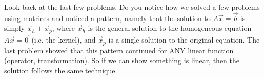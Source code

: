 Look back at the last few problems. Do you notice how we solved a few problems using matrices and noticed a pattern, namely that the solution to $A\vec x=\vec b$ is simply $\vec x_h+\vec x_p$, where $\vec x_h$ is the general solution to the homogeneous equation $A\vec x=\vec 0$ (i.e. the kernel), and $\vec x_p$ is a single solution to the original equation.  
The last problem showed that this pattern continued for ANY linear function (operator, transformation). So if we can show something is linear, then the solution follows the same technique. 



